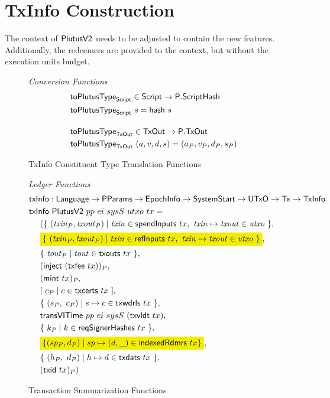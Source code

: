 \section{TxInfo Construction}
\label{sec:txinfo}

The context of $\mathsf{PlutusV2}$ needs to be adjusted to contain the new
features. Additionally, the redeemers are provided to the context, but
without the execution units budget.

\begin{figure*}[htb]
  \emph{Conversion Functions}
  \begin{align*}
    & \fun{toPlutusType}_{\Script} \in \Script \to \type{P.ScriptHash} \\
    & \fun{toPlutusType}_{\Script}~ s = \fun{hash}~s
    \nextdef
    & \fun{toPlutusType}_{\TxOut} \in \TxOut \to \type{P.TxOut} \\
    & \fun{toPlutusType}_{\TxOut}~ (a, v, d, s) = (a_P, v_P, d_P, s_P)
  \end{align*}
  \caption{TxInfo Constituent Type Translation Functions}
  \label{fig:txinfo-translations}
\end{figure*}

\begin{figure}
    \emph{Ledger Functions}
    \begin{align*}
        &\fun{txInfo} : \Language \to \PParams \to \EpochInfo \to \SystemStart \to \UTxO \to \Tx \to \TxInfo \\
        &\fun{txInfo}~\PlutusVII~pp~ ei~ sysS~ utxo~tx = \\
        & ~~~~ (\{~(\var{txin}_P, \var{txout}_P) \mid \var{txin}\in\fun{spendInputs}~tx,~\var{txin}\mapsto\var{txout}\in\var{utxo}~\}, \\
        & ~~~~ \hldiff{\{~(\var{txin}_P, \var{txout}_P) \mid \var{txin}\in\fun{refInputs}~tx,~\var{txin}\mapsto\var{txout}\in\var{utxo}~\}}, \\
        & ~~~~ \{~\var{tout}_P\mid\var{tout}\in\fun{txouts}~{tx}~\} , \\
        & ~~~~ (\fun{inject}~(\fun{txfee}~{tx}))_P, \\
        & ~~~~ (\fun{mint}~{tx})_P , \\
        & ~~~~ [~ c_P \mid c \in \fun{txcerts}~{tx} ~] , \\
        & ~~~~ \{~(s_P,~c_P)\mid s\mapsto c \in \fun{txwdrls}~{tx}~\} , \\
        & ~~~~ \fun{transVITime} ~pp ~ei~ sysS~ (\fun{txvldt}~tx)  , \\
        & ~~~~ \{~k_P\mid k \in \fun{reqSignerHashes}~{tx}~\} , \\
        & ~~~~ \hldiff{\{ (sp_P, d_P) \mid sp \mapsto (d, \_) \in \fun{indexedRdmrs}~tx \}}, \\
        & ~~~~ \{~(h_P,~d_P)\mid h\mapsto d \in \fun{txdats}~{tx}~\} , \\
        & ~~~~ (\fun{txid}~{tx})_P)
    \end{align*}
  \caption{Transaction Summarization Functions}
  \label{fig:txinfo-funcs}
\end{figure}
